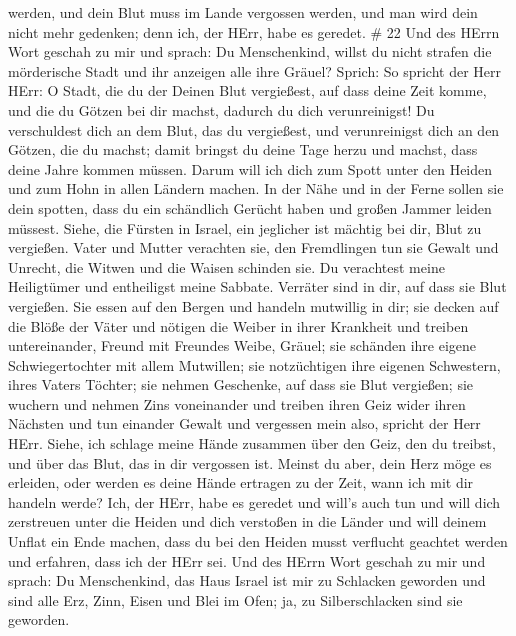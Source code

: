 werden, und dein Blut muss im Lande vergossen werden, und man wird dein
nicht mehr gedenken; denn ich, der HErr, habe es geredet. \# 22
 Und des HErrn Wort geschah zu mir und sprach: 
Du Menschenkind, willst du nicht strafen die mörderische Stadt und ihr
anzeigen alle ihre Gräuel?  Sprich: So spricht der Herr
HErr: O Stadt, die du der Deinen Blut vergießest, auf dass deine Zeit
komme, und die du Götzen bei dir machst, dadurch du dich verunreinigst!
 Du verschuldest dich an dem Blut, das du vergießest, und
verunreinigst dich an den Götzen, die du machst; damit bringst du deine
Tage herzu und machst, dass deine Jahre kommen müssen. Darum will ich
dich zum Spott unter den Heiden und zum Hohn in allen Ländern machen.
 In der Nähe und in der Ferne sollen sie dein spotten, dass
du ein schändlich Gerücht haben und großen Jammer leiden müssest.
 Siehe, die Fürsten in Israel, ein jeglicher ist mächtig bei
dir, Blut zu vergießen.  Vater und Mutter verachten sie, den
Fremdlingen tun sie Gewalt und Unrecht, die Witwen und die Waisen
schinden sie.  Du verachtest meine Heiligtümer und
entheiligst meine Sabbate.  Verräter sind in dir, auf dass
sie Blut vergießen. Sie essen auf den Bergen und handeln mutwillig in
dir;  sie decken auf die Blöße der Väter und nötigen die
Weiber in ihrer Krankheit  und treiben untereinander,
Freund mit Freundes Weibe, Gräuel; sie schänden ihre eigene
Schwiegertochter mit allem Mutwillen; sie notzüchtigen ihre eigenen
Schwestern, ihres Vaters Töchter;  sie nehmen Geschenke,
auf dass sie Blut vergießen; sie wuchern und nehmen Zins voneinander und
treiben ihren Geiz wider ihren Nächsten und tun einander Gewalt und
vergessen mein also, spricht der Herr HErr.  Siehe, ich
schlage meine Hände zusammen über den Geiz, den du treibst, und über das
Blut, das in dir vergossen ist.  Meinst du aber, dein Herz
möge es erleiden, oder werden es deine Hände ertragen zu der Zeit, wann
ich mit dir handeln werde? Ich, der HErr, habe es geredet und will's
auch tun  und will dich zerstreuen unter die Heiden und
dich verstoßen in die Länder und will deinem Unflat ein Ende machen,
 dass du bei den Heiden musst verflucht geachtet werden und
erfahren, dass ich der HErr sei.  Und des HErrn Wort
geschah zu mir und sprach:  Du Menschenkind, das Haus
Israel ist mir zu Schlacken geworden und sind alle Erz, Zinn, Eisen und
Blei im Ofen; ja, zu Silberschlacken sind sie geworden. 

